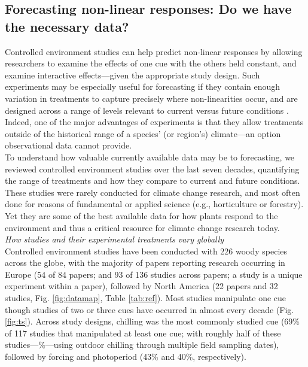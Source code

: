\documentclass[11pt,letter]{article}
\begin{document}
\subsection{Forecasting non-linear responses: Do we have the necessary data?} %
Controlled environment studies can help predict non-linear responses by allowing researchers to examine the effects of one cue with the others held constant, and examine interactive effects---given the appropriate study design. Such experiments may be especially useful for forecasting if they contain enough variation in treatments to capture precisely where non-linearities occur, and are designed across a range of levels relevant to current versus future conditions \citep{shen2015}. Indeed, one of the major advantages of experiments is that they allow treatments outside of the historical range of a species' (or region's) climate---an option observational data cannot provide. \\

To understand how valuable currently available data may be to forecasting, we reviewed controlled environment studies over the last seven decades, quantifying the range of treatments and how they compare to current and future conditions. These studies were rarely conducted for climate change research, and most often done for reasons of fundamental or applied science (e.g., horticulture or forestry). Yet they are some of the best available data for how plants respond to the environment and thus a critical resource for climate change research today.\\

\emph{How studies and their experimental treatments vary globally}\\
Controlled environment studies have been conducted with 226 woody species across the globe, with the majority of papers reporting research occurring in Europe (54 of 84 papers; and 93 of 136 studies across papers; a study is a unique experiment within a paper), followed by North America (22 papers and 32 studies, Fig. \ref{fig:datamap}, Table \ref{tab:ref}). Most studies manipulate one cue though studies of two or three cues have occurred in almost every decade (Fig. \ref{fig:ts}). Across study designs, chilling was the most commonly studied cue (69\% of 117 studies that manipulated at least one cue; with roughly half of these studies---\%---using outdoor chilling through multiple field sampling dates), followed by forcing and photoperiod (43\% and 40\%, respectively). \\
\end{document}
